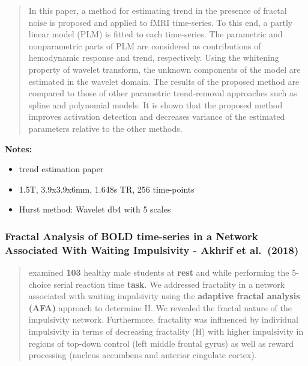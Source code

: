 \documentclass[
  sn-vancouver,
  Numbered,
  referee,
  lineno]{sn-jnl}
\providecommand{\tightlist}{%
  \setlength{\itemsep}{0pt}\setlength{\parskip}{0pt}}\usepackage{longtable,booktabs,array}
\begin{document}
\begin{quote}
In this paper, a method for estimating trend in the presence of fractal
noise is proposed and applied to fMRI time-series. To this end, a partly
linear model (PLM) is fitted to each time-series. The parametric and
nonparametric parts of PLM are considered as contributions of
hemodynamic response and trend, respectively. Using the whitening
property of wavelet transform, the unknown components of the model are
estimated in the wavelet domain. The results of the proposed method are
compared to those of other parametric trend-removal approaches such as
spline and polynomial models. It is shown that the proposed method
improves activation detection and decreases variance of the estimated
parameters relative to the other methods.
\end{quote}

\textbf{Notes:}

\begin{itemize}
\tightlist
\item
  trend estimation paper
\item
  1.5T, 3.9x3.9x6mm, 1.648s TR, 256 time-points
\item
  Hurst method: Wavelet db4 with 5 scales
\end{itemize}

\subsubsection{\texorpdfstring{Fractal Analysis of BOLD time-series in a
Network Associated With Waiting Impulsivity - Akhrif et al.~(2018)
\citep{akhrifFractalAnalysisBOLD2018}}{Fractal Analysis of BOLD time-series in a Network Associated With Waiting Impulsivity - Akhrif et al.~(2018) {[}@akhrifFractalAnalysisBOLD2018{]}}}\label{fractal-analysis-of-bold-time-series-in-a-network-associated-with-waiting-impulsivity---akhrif-et-al.-2018-akhriffractalanalysisbold2018}

\begin{quote}
examined \textbf{103 } healthy male students at \textbf{rest} and while
performing the 5-choice serial reaction time \textbf{task}. We addressed
fractality in a network associated with waiting impulsivity using the
\textbf{adaptive fractal analysis (AFA)} approach to determine H. We
revealed the fractal nature of the impulsivity network. Furthermore,
fractality was influenced by individual impulsivity in terms of
decreasing fractality (H) with higher impulsivity in regions of top-down
control (left middle frontal gyrus) as well as reward processing
(nucleus accumbens and anterior cingulate cortex).
\end{quote}
\end{document}
